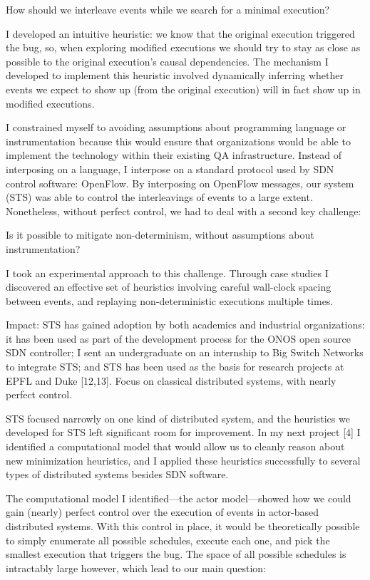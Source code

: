 	How should we interleave events while we search for a minimal execution?

I developed an intuitive heuristic: we know that the original execution triggered the bug, so, when exploring modified executions we should try to stay as close as possible to the original execution’s causal dependencies. The mechanism I developed to implement this heuristic involved dynamically inferring whether events we expect to show up (from the original execution) will in fact show up in modified executions.

I constrained myself to avoiding assumptions about programming language or instrumentation because this would ensure that organizations would be able to implement the technology within their existing QA infrastructure. Instead of interposing on a language, I interpose on a standard protocol used by SDN control software: OpenFlow. By interposing on OpenFlow messages, our system (STS) was able to control the interleavings of events to a large extent. Nonetheless, without perfect control, we had to deal with a second key challenge:

Is it possible to mitigate non-determinism, without assumptions about instrumentation?

I took an experimental approach to this challenge. Through case studies I discovered an effective set of heuristics involving careful wall-clock spacing between events, and replaying non-deterministic executions multiple times.

Impact: STS has gained adoption by both academics and industrial organizations: it has been used as part of the development process for the ONOS open source SDN controller; I sent an undergraduate on an internship to Big Switch Networks to integrate STS; and STS has been used as the basis for research projects at EPFL and Duke [12,13].
Focus on classical distributed systems, with nearly perfect control.

STS focused narrowly on one kind of distributed system, and the heuristics we developed for STS left significant room for improvement. In my next project [4] I identified a computational model that would allow us to cleanly reason about new minimization heuristics, and I applied these heuristics successfully to several types of distributed systems besides SDN software.

The computational model I identified---the actor model---showed how we could gain (nearly) perfect control over the execution of events in actor-based distributed systems. With this control in place, it would be theoretically possible to simply enumerate all possible schedules, execute each one, and pick the smallest execution that triggers the bug. The space of all possible schedules is intractably large however, which lead to our main question:

